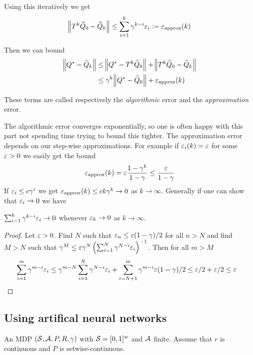 Using this iteratively we get
\[ \norm{T^k \widetilde{Q}_0 - \widetilde{Q}_k} \leq \sum_{i=1}^k \gamma^{k-i} \varepsilon_i
\vcentcolon= \varepsilon_{\mathrm{approx}}(k) \]

Then we can bound
\begin{align*}
  \norm{Q^* - \widetilde{Q}_k}
  &\leq \norm{Q^* - T^k \widetilde{Q}_0} + \norm{T^k \widetilde{Q}_0 - \widetilde{Q}_k}
  \\ &\leq \gamma^k \norm{Q^* - \widetilde{Q}_0}
  + \varepsilon_{\mathrm{approx}}(k)
\end{align*}

These terms are called respectively the \emph{algorithmic} error
and the \emph{approximation} error.

The algorithmic error converges exponentially, so one is often happy with this
part not spending time trying to bound this tighter.
The approximation error depends on our step-wise approximations. For example
if $\varepsilon_i(k) = \varepsilon$ for some $\varepsilon > 0$ we easily get the bound
\begin{equation}
  \varepsilon_{\mathrm{approx}}(k) = \varepsilon \frac{1-\gamma^k}{1-\gamma} \leq \frac{\varepsilon}{1-\gamma}
  \label{eq:approxEpsBound}
\end{equation}
If $\varepsilon_i \leq c\gamma^i$ we get $\varepsilon_{\mathrm{approx}}(k) \leq ck \gamma^k \to 0$ as
$k \to \infty$.
Generally if one can show that $\varepsilon_i \to 0$ we have
\begin{prop} $ \sum_{i-1}^k \gamma^{k-i} \varepsilon_i \to 0 $
  whenever $\varepsilon_k \to 0$ as $k \to \infty$.
\end{prop}
\begin{proof}
  Let $\varepsilon > 0$. Find $N$ such that $\varepsilon_n \leq \varepsilon (1-\gamma)/2$ 
  for all $n>N$ and find $M>N$ such that
  $\gamma^M \leq
  \varepsilon \gamma^N \left( \sum_{i=1}^N \gamma^{N-i} \varepsilon_i \right)^{-1}$.
  Then for all $m>M$
  \begin{align*}
    \sum_{i=1}^m \gamma^{m-i} \varepsilon_i
    &\leq \gamma^{m-N} \sum_{i=1}^N \gamma^{N-i} \varepsilon_i
    + \sum_{i=N+1}^m \gamma^{m-i} \varepsilon (1-\gamma)/2
    \leq \varepsilon/2 + \varepsilon/2 \leq \varepsilon
  \end{align*}
\end{proof}

\subsection{Using artifical neural networks}

\begin{sett}
  An MDP $(\mathcal{S}, \mathcal{A}, P, R, \gamma)$ with
  $\mathcal{S} = [0,1]^w$ and $\mathcal{A}$ finite.
  Assume that $r$ is continuous and
  $P$ is setwise-continuous.
  \label{sett:annApprox}
\end{sett}

